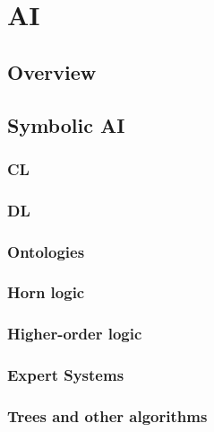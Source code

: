 
\chapter{\Acl{AI}}
\label{ch:ai}

\section{Overview}\label{sec:ai-overview}

\section{Symbolic \ac{AI}}\label{sec:symbolic-ai}

\subsection{\Acl{CL}}\label{subsec:cl}

\subsection{\Acl{DL}}\label{subsec:dl}

\subsection{Ontologies}\label{subsec:ontologies}

\subsection{Horn logic}\label{subsec:horn-logic}

\subsection{Higher-order logic}\label{subsec:higher-order-logic}

\subsection{Expert Systems}\label{subsec:expert-systems}

\subsection{Trees and other algorithms}\label{subsec:trees-and-other-algorithms}

